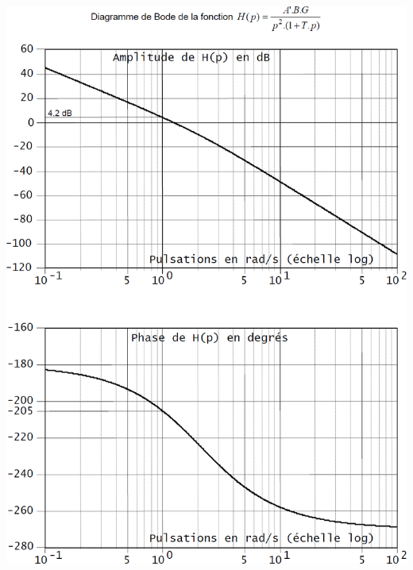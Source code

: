 \documentclass[10pt,fleqn]{article} %
\begin{document}
\begin{center}
\includegraphics[width=\linewidth]{images2/fig_07}
\end{center}
\end{document}
